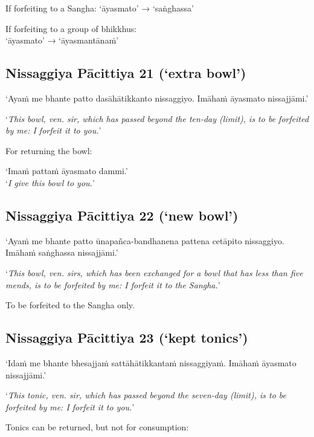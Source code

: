If forfeiting to a Sangha: ‘āyasmato’ → ‘saṅghassa’

If forfeiting to a group of bhikkhus:\\
‘āyasmato’ → ‘āyasmantānaṁ’


\subsection[NP 21 (‘extra bowl’)]{Nissaggiya Pācittiya 21 (‘extra bowl’)}

‘Ayaṁ me bhante patto dasāhātikkanto nissaggiyo. Imāhaṁ āyasmato nissajjāmi.’

‘\emph{This bowl, ven. sir, which has passed beyond the ten-day (limit), is to be
  forfeited by me: I forfeit it to you.}’


For returning the bowl:

‘Imaṁ pattaṁ āyasmato dammi.’\\
‘\emph{I give this bowl to you.}’ 

\subsection[NP 22 (‘new bowl’)]{Nissaggiya Pācittiya 22 (‘new bowl’)}

‘Ayaṁ me bhante patto ūnapañca-bandhanena pattena cetāpito nissaggiyo. Imāhaṁ
saṅghassa nissajjāmi.’

‘\emph{This bowl, ven. sirs, which has been exchanged for a bowl that has less
  than five mends, is to be forfeited by me: I forfeit it to the Sangha.}’

To be forfeited to the Sangha only. 

\subsection[NP 23 (‘kept tonics’)]{Nissaggiya Pācittiya 23 (‘kept tonics’)}

‘Idaṁ me bhante bhesajjaṁ sattāhātikkantaṁ nissaggiyaṁ. Imāhaṁ āyasmato
nissajjāmi.’

‘\emph{This tonic, ven. sir, which has passed beyond the seven-day
  (limit), is to be forfeited by me: I forfeit it to you.}’

Tonics can be returned, but not for consumption:

